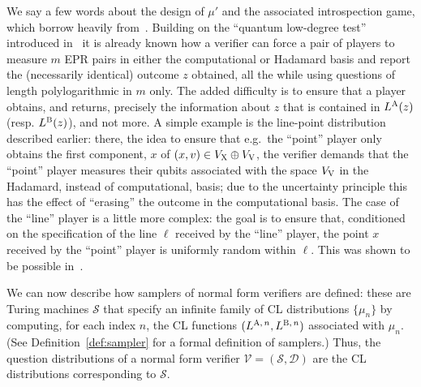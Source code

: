 \documentclass[11pt]{article}
\theoremstyle{definition}
\newcommand{\sampler}{\mathcal{S}}
\newcommand{\decider}{\mathcal{D}}
\newcommand{\verifier}{\mathcal{V}}
\newcommand{\labelstyle}[1]{\ensuremath{\textsc{#1}}\xspace}
\newcommand{\xpt}{\labelstyle{X}}
\newcommand{\dir}[1]{\labelstyle{V#1}}
\newcommand{\alice}{\labelstyle{A}}
\newcommand{\bob}{\labelstyle{B}}
\begin{document}
We say a few words about the design of $\mu'$ and the associated introspection game, which borrow heavily from~\cite{NW19}. Building on the ``quantum low-degree test'' introduced in~\cite{natarajan2018low} it is already known how a verifier can force a pair of players to measure $m$ EPR pairs in either the computational or Hadamard basis and report the (necessarily identical) outcome $z$ obtained, all the while using questions of length polylogarithmic in $m$ only. The added difficulty is to ensure that a player obtains, and returns, precisely the information about $z$ that is contained in $L^\alice(z)$ (resp. $L^\bob(z)$), and not more. A simple example is the line-point distribution described earlier: there, the idea to ensure that e.g.\ the ``point'' player only obtains the first component, $x$ of $(x,v) \in V_\xpt \oplus V_{\dir{}}$, the verifier demands that the ``point'' player measures their qubits associated with the space $V_{\dir{}}$ in the Hadamard, instead of computational, basis; due to the uncertainty principle this has the effect of ``erasing'' the outcome in the computational basis.  The case of the ``line'' player is a little more complex: the goal is to ensure that, conditioned on the specification of the line $\ell$ received by the ``line'' player, the point $x$ received by the ``point'' player is uniformly random within $\ell$. This was shown to be possible in~\cite{NW19}.

We can now describe how samplers of normal form verifiers are defined: these are
Turing machines $\sampler$ that specify an infinite family of CL distributions
$\{ \mu_n \}$ by computing, for each index $n$, 
the CL functions $(L^{\alice,\, n},L^{\bob,\, n})$ associated with $\mu_n$. 
(See Definition~\ref{def:sampler} for a formal definition of samplers.)
Thus, the question distributions of a normal form verifier $\verifier =
(\sampler,\decider)$ are the CL distributions corresponding to $\sampler$.

    
    
\end{document}
